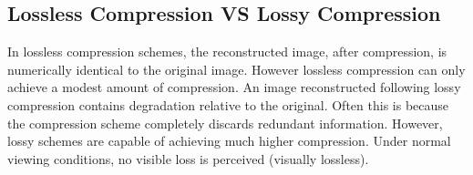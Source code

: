 \subsection{Lossless Compression VS Lossy Compression}
In lossless compression schemes, the reconstructed image, after compression, is numerically identical to the original image. However lossless compression can only achieve a modest amount of compression. An image reconstructed following lossy compression contains degradation relative to the original. Often this is because the compression scheme completely discards redundant information. However, lossy schemes are capable of achieving much higher compression. Under normal viewing conditions, no visible loss is perceived (visually lossless)\cite{Dhawan:2011}.
